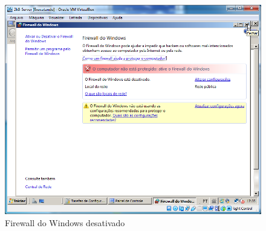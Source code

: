 \documentclass[10pt]{article}
\begin{document}
\begin{figure}[H]
    \centering
    \caption{Firewall do Windows desativado}
    \label{fig:4215}
    \includegraphics[width=\linewidth]{images/configuracao_windows/windows_server/007.png}
\end{figure}
\end{document}
